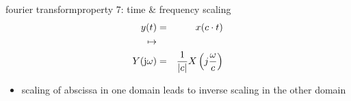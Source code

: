         \begin{frame}{fourier transform}{property 7: time \& frequency scaling}
            \vspace{-5mm}
            \begin{eqnarray*}
                y(t) &=& x(c\cdot t)\\ \mapsto&&\\ Y(\mathrm{j}\omega) &=& \frac{1}{|c|}X\left(j\frac{\omega}{c}\right) 
            \end{eqnarray*}
            
            \bigskip
            \begin{itemize}
                \item<2->   scaling of abscissa in one domain leads to inverse scaling in the other domain
            \end{itemize}
        \end{frame}	
%
